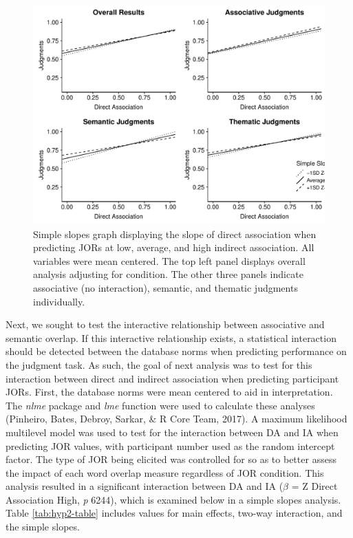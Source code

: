 \documentclass[english,,man]{apa6}
\begin{document}
\begin{figure}
\centering
\includegraphics{max_buch_JOL_files/figure-latex/hyp2graph-1.pdf}
\caption{\label{fig:hyp2graph}Simple slopes graph displaying the slope of direct association when predicting JORs at low, average, and high indirect association. All variables were mean centered. The top left panel displays overall analysis adjusting for condition. The other three panels indicate associative (no interaction), semantic, and thematic judgments individually.}
\end{figure}

Next, we sought to test the interactive relationship between associative and semantic overlap. If this interactive relationship exists, a statistical interaction should be detected between the database norms when predicting performance on the judgment task. As such, the goal of next analysis was to test for this interaction between direct and indirect association when predicting participant JORs. First, the database norms were mean centered to aid in interpretation. The \emph{nlme} package and \emph{lme} function were used to calculate these analyses (Pinheiro, Bates, Debroy, Sarkar, \& R Core Team, 2017). A maximum likelihood multilevel model was used to test for the interaction between DA and IA when predicting JOR values, with participant number used as the random intercept factor. The type of JOR being elicited was controlled for so as to better assess the impact of each word overlap measure regardless of JOR condition. This analysis resulted in a significant interaction between DA and IA (\(\beta\) = Z Direct Association High, \emph{p} 6244), which is examined below in a simple slopes analysis. Table \ref{tab:hyp2-table} includes values for main effects, two-way interaction, and the simple slopes.
\end{document}
